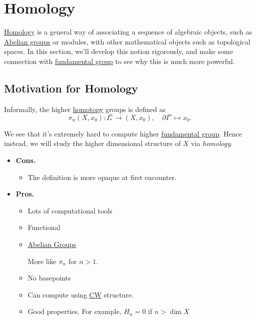 \chapter{Homology}
\hyperref[def:homology-class]{Homology} is a general way of associating a sequence of algebraic objects, such as \hyperref[def:Abelian-group]{Abelian groups}
or modules, with other  mathematical objects such as topological spaces. In this section, we'll develop this notion rigorously, and make some connection
with \hyperref[def:fundamental-group]{fundamental group} to see why this is much more powerful.


\section{Motivation for Homology}
Informally, the higher \hyperref[def:homotopy]{homotopy} groups is defined as
\[
	\pi _{n} (X, x_0)\colon I^n_\ast \to (X, x_0),\quad \partial I^n \mapsto x_0.
\]

\begin{figure}[H]
	\centering
	\label{fig:higher-homotopy-group-dim2}
\end{figure}


We see that it's extremely hard to compute higher \hyperref[def:fundamental-group]{fundamental group}. Hence instead,
we will study the higher dimensional structure of \(X\) via \emph{homology}.

\begin{itemize}
	\item \textbf{Cons.}
	      \begin{itemize}
		      \item The definition is more opaque at first encounter.
	      \end{itemize}
	\item \textbf{Pros.}
	      \begin{itemize}
		      \item Lots of computational tools
		      \item Functional
		      \item \hyperref[def:Abelian-group]{Abelian Groups}
		            \begin{remark}
			            More like \(\pi _n\) for \(n>1\).
		            \end{remark}
		      \item No basepoints
		      \item Can compute using \hyperref[def:CW-subcomplex]{CW} structure.
		      \item Good properties. For example, \(H_{n} = 0\) if \(n > \dim X\)
	      \end{itemize}
\end{itemize}


